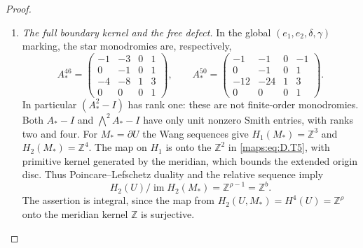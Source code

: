 \begin{proof}
\begin{enumerate}[label=\arabic*.,leftmargin=*]
\item \emph{The full boundary kernel and the free defect.}
In the global $(e_1,e_2,\delta,\gamma)$ marking, the star
monodromies are, respectively,
\[
 A_*^{46}=\begin{pmatrix}
 -1&-3&0&1\\0&-1&0&1\\-4&-8&1&3\\0&0&0&1
 \end{pmatrix},\qquad
 A_*^{50}=\begin{pmatrix}
 -1&-1&0&-1\\0&-1&0&1\\-12&-24&1&3\\0&0&0&1
 \end{pmatrix}.
 \tag{D.T6}\label{maps:eq:D.T6}
\]
In particular $(A_*^2-I)$ has rank one: these are not
finite-order monodromies. Both $A_*-I$ and
$\bigwedge^2A_*-I$ have only unit nonzero Smith entries,
with ranks two and four. For $M_*=\partial U$ the Wang
sequences give $H_1(M_*)=\mathbb Z^3$ and
$H_2(M_*)=\mathbb Z^4$. The map on $H_1$ is onto the
$\mathbb Z^2$ in \eqref{maps:eq:D.T5}, with primitive kernel generated
by the meridian, which bounds the extended origin disc.
Thus Poincare--Lefschetz duality and the relative sequence
imply
\[
 H_2(U)/\operatorname{im}H_2(M_*)=\mathbb Z^{\rho-1}
                                           =\mathbb Z^b.
 \tag{D.T7}\label{maps:eq:D.T7}
\]
The assertion is integral, since the map from
$H_2(U,M_*)=H^4(U)=\mathbb Z^\rho$ onto the meridian
kernel $\mathbb Z$ is surjective.


\end{enumerate}
\end{proof}
